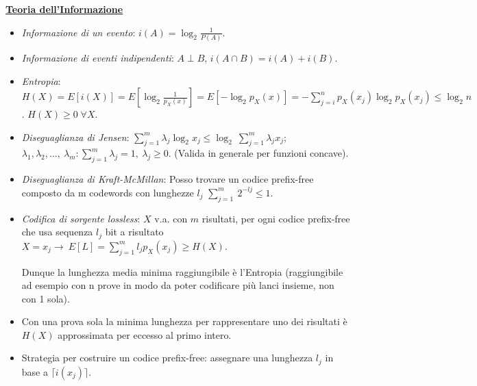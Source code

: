 \documentclass[8pt]{extarticle}
\begin{document}
\begin{multicols*}{3}
    \textbf{\underline{Teoria dell'Informazione}}
    \begin{itemize}
        \item \textit{Informazione di un evento}: $i(A)=\log_{2}{\frac{1}{P(A)}}$.
        \item \textit{Informazione di eventi indipendenti}: $A\perp B$, $i(A\cap B)=i(A)+i(B)$.
        \item \textit{Entropia}: $H(X)=E\left[i(X)\right]=E\left[\log_{2}\frac{1}{p_{X}(x)}\right]=E\left[-\log_{2} p_{X}(x)\right]=-\sum_{j=i}^{n}p_{X}(x_{j})\log_{2} p_{X}(x_{j})\leq \log_{2} n$. $H(X)\ge 0\; \forall X$.
        \item \textit{Diseguaglianza di Jensen}: $\sum_{j=1}^{m}{\lambda_j\log_{2}{x_j}}\le\log_{2}{\ \sum_{j=1}^{m}{\lambda_jx_j}}$; $\lambda_1,\lambda_2,\ldots,\ \lambda_m:\sum_{j=1}^{m}\lambda_j=1,\ \lambda_j\geq 0$. (Valida in generale per funzioni concave).
        \item \textit{Diseguaglianza di Kraft-McMillan}: Posso trovare un codice prefix-free composto da m codewords con lunghezze $l_{j}$ $\sum_{j=1}^{m}{\ 2^{-lj}}\le1$.
        \item \textit{Codifica di sorgente lossless}: $X$ v.a. con $m$ risultati, per ogni codice prefix-free che usa sequenza $l_j$ bit a risultato $X=x_j\rightarrow\ E\left[L\right]=\sum_{j=1}^{m}{l_jp_X\left(x_j\right)}\geq H\left(X\right)$.

        Dunque la lunghezza media minima raggiungibile è l'Entropia (raggiungibile ad esempio con n prove in modo da poter codificare più lanci insieme, non con 1 sola).

        \item Con una prova sola la minima lunghezza per rappresentare uno dei risultati è $H(X)$ approssimata per eccesso al primo intero.

        \item Strategia per costruire un codice prefix-free: assegnare una lunghezza $l_{j}$ in base a $\lceil i(x_{j})\rceil$.
    \end{itemize}

\end{multicols*}
\end{document}

